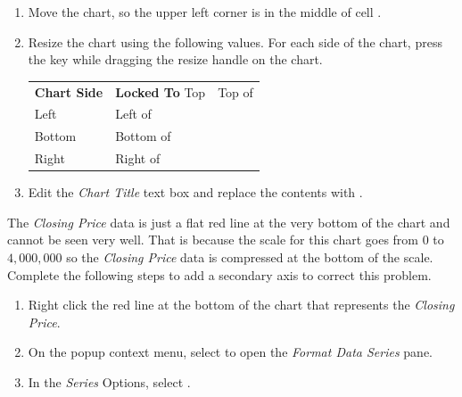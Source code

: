\begin{enumbox}
	\begin{enumerate}
		\item Move the chart, so the upper left corner is in the middle of cell .
		\item Resize the chart using the following values. For each side of the chart, press the  key while dragging the resize handle on the chart.
		
		\begin{table}[H]
			\captionsetup{labelformat=empty} %
			{\small
				\begin{longtable}{R{0.75in}L{1.50in}} %
					\textbf{Chart Side} & \textbf{Locked To} \endhead
					\hline
					Top & Top of \\
					Left & Left of \\
					Bottom & Bottom of \\
					Right & Right of \\
				\end{longtable}
			} %
		\end{table}

		\item Edit the \textit{Chart Title} text box and replace the contents with .
	\end{enumerate}
\end{enumbox}

The \textit{Closing Price} data is just a flat red line at the very bottom of the chart and cannot be seen very well. That is because the scale for this chart goes from $ 0 $ to $ 4,000,000 $ so the \textit{Closing Price} data is compressed at the bottom of the scale. Complete the following steps to add a secondary axis to correct this problem.

\begin{enumbox}
	\begin{enumerate}
		\item Right click the red line at the bottom of the chart that represents the \textit{Closing Price}.
		\item On the popup context menu, select  to open the \textit{Format Data Series} pane.
		\item In the \textit{Series} Options, select .
	\end{enumerate}
\end{enumbox}
	
